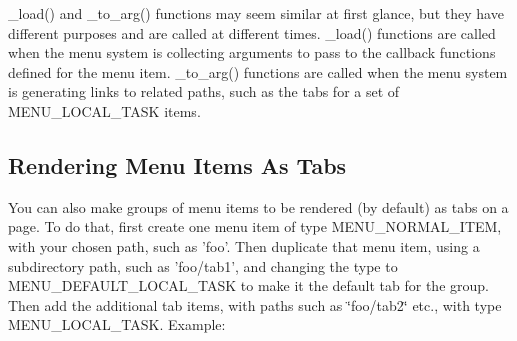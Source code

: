 \_\-load() and \_\-to\_\-arg() functions may seem similar at first glance, but they have different purposes and are called at different times. \_\-load() functions are called when the menu system is collecting arguments to pass to the callback functions defined for the menu item. \_\-to\_\-arg() functions are called when the menu system is generating links to related paths, such as the tabs for a set of MENU\_\-LOCAL\_\-TASK items.\hypertarget{group__hooks_sec_render_tabs}{}\subsection{Rendering Menu Items As Tabs}\label{group__hooks_sec_render_tabs}
You can also make groups of menu items to be rendered (by default) as tabs on a page. To do that, first create one menu item of type MENU\_\-NORMAL\_\-ITEM, with your chosen path, such as 'foo'. Then duplicate that menu item, using a subdirectory path, such as 'foo/tab1', and changing the type to MENU\_\-DEFAULT\_\-LOCAL\_\-TASK to make it the default tab for the group. Then add the additional tab items, with paths such as \char`\"{}foo/tab2\char`\"{} etc., with type MENU\_\-LOCAL\_\-TASK. Example: 


